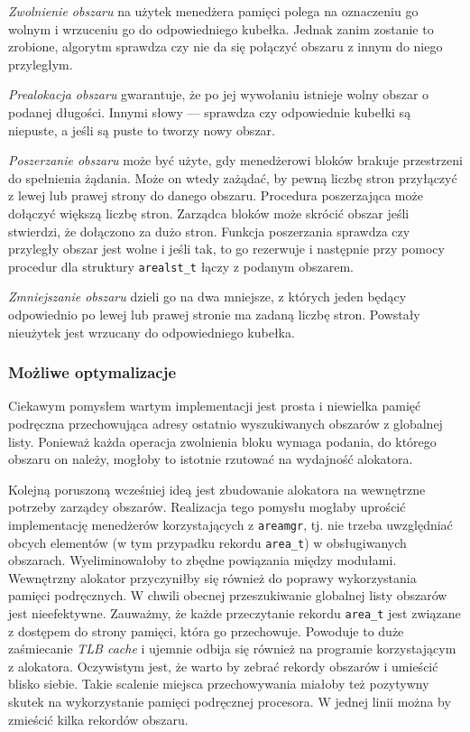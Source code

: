 \documentclass[12pt,a4paper,titlepage,twoside]{mwart}
\begin{document}
\textit{Zwolnienie obszaru} na użytek menedżera pamięci polega na oznaczeniu go
wolnym i wrzuceniu go do odpowiedniego kubełka. Jednak zanim zostanie to zrobione,
algorytm sprawdza czy nie da się połączyć obszaru z innym do niego przyległym.

\textit{Prealokacja obszaru} gwarantuje, że po jej wywołaniu istnieje wolny
obszar o podanej długości. Innymi słowy --- sprawdza czy odpowiednie kubełki są
niepuste, a jeśli są puste to tworzy nowy obszar.

\textit{Poszerzanie obszaru} może być użyte, gdy menedżerowi bloków brakuje
przestrzeni do spełnienia żądania. Może on wtedy zażądać, by pewną liczbę stron
przyłączyć z lewej lub prawej strony do danego obszaru. Procedura poszerzająca
może dołączyć większą liczbę stron. Zarządca bloków może skrócić obszar jeśli
stwierdzi, że dołączono za dużo stron. Funkcja poszerzania sprawdza czy
przyległy obszar jest wolne i jeśli tak, to go rezerwuje i następnie przy pomocy
procedur dla struktury \verb+arealst_t+ łączy z podanym obszarem.

\textit{Zmniejszanie obszaru} dzieli go na dwa mniejsze, z których jeden będący
odpowiednio po lewej lub prawej stronie ma zadaną liczbę stron. Powstały
nieużytek jest wrzucany do odpowiedniego kubełka.

\subsubsection{Możliwe optymalizacje}

Ciekawym pomysłem wartym implementacji jest prosta i niewielka pamięć podręczna
przechowująca adresy ostatnio wyszukiwanych obszarów z globalnej listy.
Ponieważ każda operacja zwolnienia bloku wymaga podania, do którego obszaru on
należy, mogłoby to istotnie rzutować na wydajność alokatora.

Kolejną poruszoną wcześniej ideą jest zbudowanie alokatora na wewnętrzne
potrzeby zarządcy obszarów. Realizacja tego pomysłu mogłaby uprościć
implementację menedżerów korzystających z \texttt{areamgr}, tj. nie trzeba
uwzględniać obcych elementów (w tym przypadku rekordu \texttt{area\_t}) w
obsługiwanych obszarach. Wyeliminowałoby to zbędne powiązania między modułami.
Wewnętrzny alokator przyczyniłby się również do poprawy wykorzystania pamięci
podręcznych. W chwili obecnej przeszukiwanie globalnej listy obszarów jest
nieefektywne. Zauważmy, że każde przeczytanie rekordu \texttt{area\_t} jest
związane z dostępem do strony pamięci, która go przechowuje. Powoduje to duże
zaśmiecanie \textit{TLB cache} i ujemnie odbija się również na programie
korzystającym z alokatora. Oczywistym jest, że warto by zebrać rekordy obszarów
i umieścić blisko siebie. Takie scalenie miejsca przechowywania miałoby też
pozytywny skutek na wykorzystanie pamięci podręcznej procesora. W jednej linii
można by zmieścić kilka rekordów obszaru.
\end{document}
